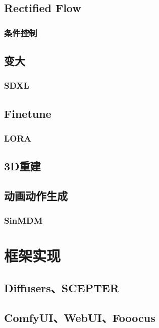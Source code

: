 \subsection{Rectified Flow}



\subsubsection{条件控制}



\subsection{变大}
\subsubsection{SDXL}



\subsection{Finetune}
\subsubsection{LORA}



\subsection{3D重建}



\subsection{动画动作生成}
\subsubsection{SinMDM}




\section{框架实现}
\subsection{Diffusers、SCEPTER}



\subsection{ComfyUI、WebUI、Fooocus}







